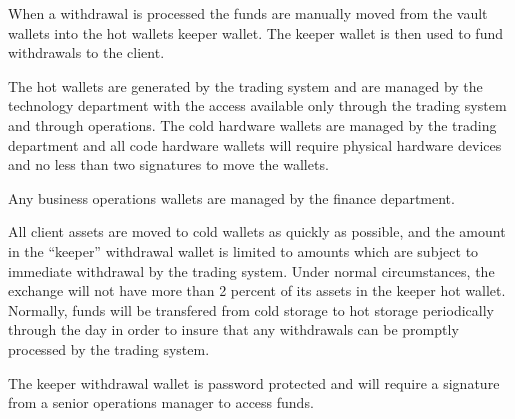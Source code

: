 When a withdrawal is processed the funds are manually moved from the
vault wallets into the hot wallets keeper wallet.  The keeper wallet
is then used to fund withdrawals to the client.

The hot wallets are generated by the trading system and are managed by
the technology department with the access available only through the
trading system and through operations.  The cold hardware wallets are
managed by the trading department and all code hardware wallets will
require physical hardware devices and no less than two signatures to
move the wallets.

Any business operations wallets are managed by the finance
department.

All client assets are moved to cold wallets as quickly as possible,
and the amount in the ``keeper'' withdrawal wallet is limited to
amounts which are subject to immediate withdrawal by the trading
system.  Under normal circumstances, the exchange will not have more
than 2 percent of its assets in the keeper hot wallet.  Normally,
funds will be transfered from cold storage to hot storage periodically
through the day in order to insure that any withdrawals can be
promptly processed by the trading system.

The keeper withdrawal wallet is password protected and will require a
signature from a senior operations manager to access funds.


